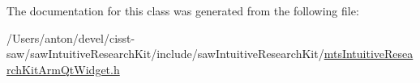 The documentation for this class was generated from the following file\+:\begin{DoxyCompactItemize}
\item 
/\+Users/anton/devel/cisst-\/saw/saw\+Intuitive\+Research\+Kit/include/saw\+Intuitive\+Research\+Kit/\hyperlink{mts_intuitive_research_kit_arm_qt_widget_8h}{mts\+Intuitive\+Research\+Kit\+Arm\+Qt\+Widget.\+h}\end{DoxyCompactItemize}
